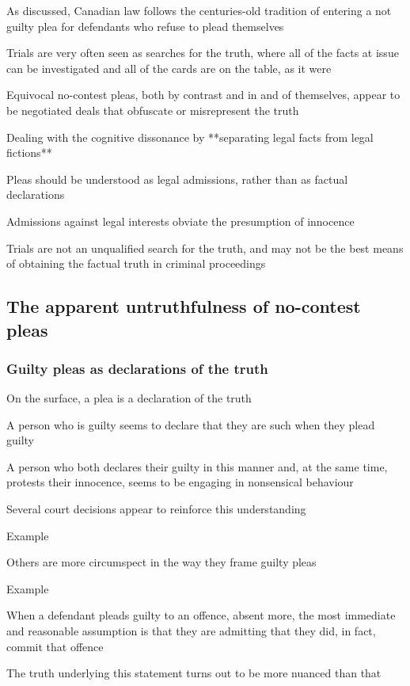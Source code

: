 As discussed, Canadian law follows the centuries-old tradition of entering a not guilty plea for defendants who refuse to plead themselves

Trials are very often seen as searches for the truth, where all of the facts at issue can be investigated and all of the cards are on the table, as it were

Equivocal no-contest pleas, both by contrast and in and of themselves, appear to be negotiated deals that obfuscate or misrepresent the truth

Dealing with the cognitive dissonance by **separating legal facts from legal fictions**

Pleas should be understood as legal admissions, rather than as factual declarations

Admissions against legal interests obviate the presumption of innocence

Trials are not an unqualified search for the truth, and may not be the best means of obtaining the factual truth in criminal proceedings

\subsection{The apparent untruthfulness of no-contest pleas}

\subsubsection{Guilty pleas as declarations of the truth}
On the surface, a plea is a declaration of the truth

A person who is guilty seems to declare that they are such when they plead guilty

A person who both declares their guilty in this manner and, at the same time, protests their innocence, seems to be engaging in nonsensical behaviour

Several court decisions appear to reinforce this understanding

Example

Others are more circumspect in the way they frame guilty pleas

Example

When a defendant pleads guilty to an offence, absent more, the most immediate and reasonable assumption is that they are admitting that they did, in fact, commit that offence

The truth underlying this statement turns out to be more nuanced than that

